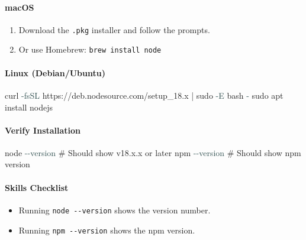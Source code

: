 \documentclass[
  justified,
  openright,
]{tufte-book}
\let\subsubsection\paragraph
\let\paragraph\paragraph
\newcommand{\AttributeTok}[1]{\textcolor{DarkSlateGray}{#1}}
\newcommand{\CommentTok}[1]{\textcolor{MidGray}{#1}}
\newcommand{\ExtensionTok}[1]{#1}
\newcommand{\FunctionTok}[1]{\textcolor{BrandBlue}{#1}}
\newcommand{\KeywordTok}[1]{\textcolor{BrandBlue}{#1}}
\newcommand{\NormalTok}[1]{#1}
\newenvironment{Shaded}{%
  \begin{snugshade}
}{%
  \end{snugshade}
}
\let\subsubsection\paragraph
\let\paragraph\paragraph
\providecommand{\tightlist}{%
  \setlength{\itemsep}{0pt}\setlength{\parskip}{0pt}}
\begin{document}
\paragraph{macOS}\label{macos}

\begin{enumerate}
\def\labelenumi{\arabic{enumi}.}
\tightlist
\item
  Download the \texttt{.pkg} installer and follow the prompts.
\item
  Or use Homebrew: \texttt{brew\ install\ node}
\end{enumerate}

\paragraph{Linux (Debian/Ubuntu)}\label{linux-debianubuntu}

\begin{Shaded}
\begin{Highlighting}[]
\ExtensionTok{curl} \AttributeTok{{-}fsSL}\NormalTok{ https://deb.nodesource.com/setup\_18.x }\KeywordTok{|} \FunctionTok{sudo} \AttributeTok{{-}E}\NormalTok{ bash }\AttributeTok{{-}}
\FunctionTok{sudo}\NormalTok{ apt install nodejs}
\end{Highlighting}
\end{Shaded}

\subsubsection{Verify Installation}\label{verify-installation}

\begin{Shaded}
\begin{Highlighting}[]
\ExtensionTok{node} \AttributeTok{{-}{-}version}     \CommentTok{\# Should show v18.x.x or later}
\ExtensionTok{npm} \AttributeTok{{-}{-}version}      \CommentTok{\# Should show npm version}
\end{Highlighting}
\end{Shaded}

\subsubsection{Skills Checklist}\label{skills-checklist}

\begin{itemize}
\tightlist
\item[$\square$]
  Running \texttt{node\ -\/-version} shows the version number.
\item[$\square$]
  Running \texttt{npm\ -\/-version} shows the npm version.
\end{itemize}
\end{document}
